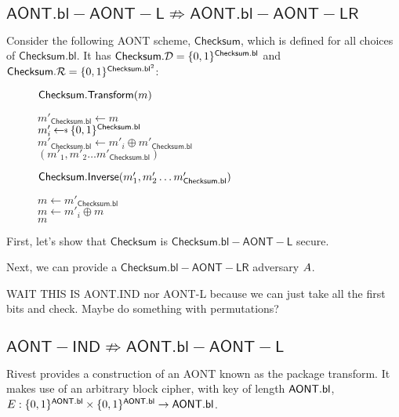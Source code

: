 \documentclass[11pt,twoside]{article}
\begin{document}
\subsection{$\mathsf{AONT.bl-AONT-L}\not\Rightarrow \mathsf{AONT.bl-AONT-LR}$}

Consider the following AONT scheme, $\mathsf{Checksum}$, which is defined for all choices of $\mathsf{Checksum.bl}$. It has $\mathsf{Checksum}.\mathcal{D}=\{0,1\}^{\mathsf{Checksum.bl}}$ and $\mathsf{Checksum}.\mathcal{R}=\{0,1\}^{\mathsf{Checksum.bl}^2}$:

\begin{figure}[H]
{
\underline{$\mathsf{Checksum.Transform}(m)$}
\begin{algorithm}[H]
$m'_\mathsf{Checksum.bl}\gets m$\\
{
$m'_i\getsr \bits^\mathsf{Checksum.bl}$\\
$m'_\mathsf{Checksum.bl}\gets m'_i \oplus m'_\mathsf{Checksum.bl}$\\
}
\Return $(m'_1,m'_2\dots m'_\mathsf{Checksum.bl})$
\end{algorithm}
}
{
\underline{$\mathsf{Checksum.Inverse}(m'_1,m'_2\dots m'_\mathsf{Checksum.bl})$}

\begin{algorithm}[H]
$m\gets m'_\mathsf{Checksum.bl}$\\
{
$m\gets m'_i \oplus m$\\
}
\Return $m$ 
\end{algorithm}
}
\end{figure} 

First, let's show that $\mathsf{Checksum}$ is $\mathsf{Checksum.bl-AONT-L}$ secure. 

Next, we can provide a $\mathsf{Checksum.bl-AONT-LR}$ adversary $A$. 

WAIT THIS IS AONT.IND nor AONT-L because we can just take all the first bits and check. Maybe do something with permutations? 

\subsection{$\mathsf{AONT-IND} \not\Rightarrow \mathsf{AONT.bl-AONT-L}$}

Rivest provides a construction of an AONT known as the package transform. It makes use of an arbitrary block cipher, with key of length $\mathsf{AONT.bl}$, $E : \{0,1\}^{\mathsf{AONT.bl}} \times \{0,1\}^{\mathsf{AONT.bl}}\rightarrow \mathsf{AONT.bl}$. 
\end{document}
